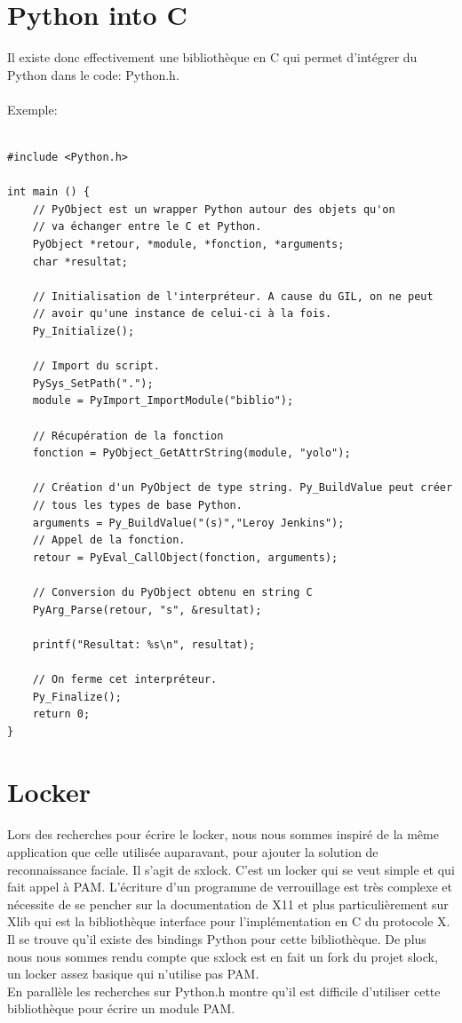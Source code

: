 \documentclass{article}
\begin{document}
  \section{Python into C}

  Il existe donc effectivement une bibliothèque en C qui permet d’intégrer du
  Python dans le code: Python.h.
\\ \\
  Exemple:

  \begin{verbatim}

#include <Python.h>

int main () {
    // PyObject est un wrapper Python autour des objets qu'on
    // va échanger entre le C et Python.
    PyObject *retour, *module, *fonction, *arguments;
    char *resultat;

    // Initialisation de l'interpréteur. A cause du GIL, on ne peut
    // avoir qu'une instance de celui-ci à la fois.
    Py_Initialize();

    // Import du script.
    PySys_SetPath(".");
    module = PyImport_ImportModule("biblio");

    // Récupération de la fonction
    fonction = PyObject_GetAttrString(module, "yolo");

    // Création d'un PyObject de type string. Py_BuildValue peut créer
    // tous les types de base Python.
    arguments = Py_BuildValue("(s)","Leroy Jenkins");
    // Appel de la fonction.
    retour = PyEval_CallObject(fonction, arguments);

    // Conversion du PyObject obtenu en string C
    PyArg_Parse(retour, "s", &resultat);

    printf("Resultat: %s\n", resultat);

    // On ferme cet interpréteur.
    Py_Finalize();
    return 0;
}
  \end{verbatim}

  \section{Locker}

  Lors des recherches pour écrire le locker, nous nous sommes inspiré de la même
  application que celle utilisée auparavant, pour ajouter la solution de
  reconnaissance faciale. Il s’agit de sxlock. C’est un locker qui se
  veut simple et qui fait appel à PAM. L’écriture d’un programme de
  verrouillage est très complexe et nécessite de se pencher sur la
  documentation de X11 et plus particulièrement sur Xlib qui est la
  bibliothèque interface pour l’implémentation en C du protocole X. Il se
  trouve qu’il existe des bindings Python pour cette bibliothèque. De plus nous
  nous sommes rendu compte que sxlock est en fait un fork du projet slock, un
  locker assez basique qui n’utilise pas PAM.
\\
  En parallèle les recherches sur Python.h montre qu’il est difficile
  d’utiliser cette bibliothèque pour écrire un module PAM.
\end{document}
